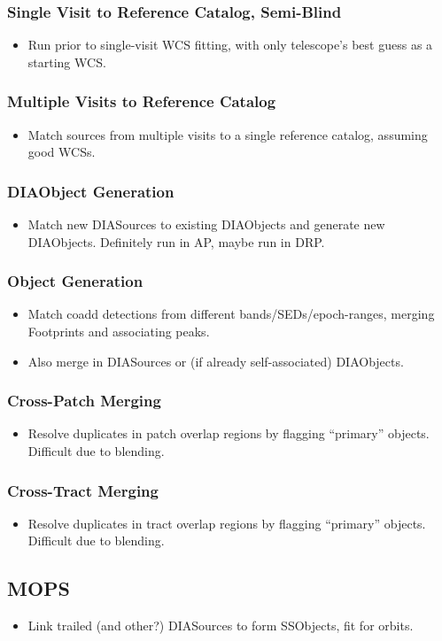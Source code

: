 \subsubsection{Single Visit to Reference Catalog, Semi-Blind}
\begin{itemize}
\item Run prior to single-visit WCS fitting, with only telescope's best guess as a starting WCS.
\end{itemize}
\subsubsection{Multiple Visits to Reference Catalog}
\begin{itemize}
\item Match sources from multiple visits to a single reference catalog, assuming good WCSs.
\end{itemize}
\subsubsection{DIAObject Generation}
\begin{itemize}
\item Match new DIASources to existing DIAObjects and generate new DIAObjects.  Definitely run in AP, maybe run in DRP.
\end{itemize}
\subsubsection{Object Generation}
\begin{itemize}
\item Match coadd detections from different bands/SEDs/epoch-ranges, merging Footprints and associating peaks.
\item Also merge in DIASources or (if already self-associated) DIAObjects.
\end{itemize}
\subsubsection{Cross-Patch Merging}
\begin{itemize}
\item Resolve duplicates in patch overlap regions by flagging ``primary'' objects.  Difficult due to blending.
\end{itemize}
\subsubsection{Cross-Tract Merging}
\begin{itemize}
\item Resolve duplicates in tract overlap regions by flagging ``primary'' objects.  Difficult due to blending.
\end{itemize}

\subsection{MOPS}
\begin{itemize}
\item Link trailed (and other?) DIASources to form SSObjects, fit for orbits.
\end{itemize}
